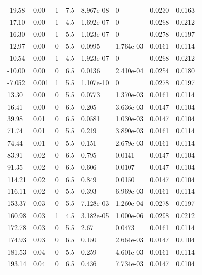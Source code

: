 \documentclass[preview]{standalone}
\begin{document}
{{\begin{tabular}{L{1.2cm}C{1.2cm} C{0.3cm}C{0.5cm} C{1.4cm}C{1.4cm} C{1.4cm}C{1.4cm}}
  -19.58  &  0.00  & 1     & 7.5 &  8.967e-08  & 0  & 0.0230 &  0.0163   \\ 
  -17.10  &  0.00  & 1     & 4.5 &  1.692e-07  & 0  & 0.0298 &  0.0212   \\ 
  -16.30  &  0.00  & 1     & 5.5 &  1.023e-07  & 0  & 0.0278 &  0.0197   \\ 
  -12.97  &  0.00  & 0     & 5.5 &  0.0995  & 1.764e-03  & 0.0161 &  0.0114   \\ 
  -10.54  &  0.00  & 1     & 4.5 &  1.923e-07  & 0  & 0.0298 &  0.0212   \\ 
  -10.00  &  0.00  & 0     & 6.5 &  0.0136  & 2.410e-04  & 0.0254 &  0.0180   \\ 
  -7.052  &  0.001  & 1     & 5.5 &  1.107e-10  & 0  & 0.0278 &  0.0197   \\ 
  13.30  &  0.00  & 0     & 5.5 &  0.0773  & 1.370e-03  & 0.0161 &  0.0114   \\ 
  16.41  &  0.00  & 0     & 6.5 &  0.205  & 3.636e-03  & 0.0147 &  0.0104   \\ 
  39.98  &  0.01  & 0     & 6.5 &  0.0581  & 1.030e-03  & 0.0147 &  0.0104   \\ 
  71.74  &  0.01  & 0     & 5.5 &  0.219  & 3.890e-03  & 0.0161 &  0.0114   \\ 
  74.44  &  0.01  & 0     & 5.5 &  0.151  & 2.679e-03  & 0.0161 &  0.0114   \\ 
  83.91  &  0.02  & 0     & 6.5 &  0.795  & 0.0141  & 0.0147 &  0.0104   \\ 
  91.35  &  0.02  & 0     & 6.5 &  0.606  & 0.0107  & 0.0147 &  0.0104   \\ 
  114.21  &  0.02  & 0     & 6.5 &  0.849  & 0.0150  & 0.0147 &  0.0104   \\ 
  116.11  &  0.02  & 0     & 5.5 &  0.393  & 6.969e-03  & 0.0161 &  0.0114   \\ 
  153.37  &  0.03  & 0     & 5.5 &  7.128e-03  & 1.260e-04  & 0.0278 &  0.0197   \\ 
  160.98  &  0.03  & 1     & 4.5 &  3.182e-05  & 1.000e-06  & 0.0298 &  0.0212   \\ 
  172.78  &  0.03  & 0     & 5.5 &  2.67  & 0.0473  & 0.0161 &  0.0114   \\ 
  174.93  &  0.03  & 0     & 6.5 &  0.150  & 2.664e-03  & 0.0147 &  0.0104   \\ 
  181.53  &  0.04  & 0     & 5.5 &  0.259  & 4.601e-03  & 0.0161 &  0.0114   \\ 
  193.14  &  0.04  & 0     & 6.5 &  0.436  & 7.734e-03  & 0.0147 &  0.0104   \\ 

\end{tabular}}}
\end{document}

